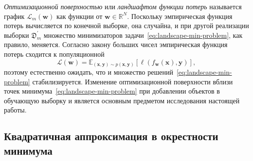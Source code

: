 \emph{Оптимизационной поверхностью} или \emph{ландшафтом функции потерь} называется график $\mathcal{L}_{m}(\mathbf{w})$ как функции от $\mathbf{w} \in \mathbb{R}^N$. Поскольку эмпирическая функция потерь вычисляется по конечной выборке, она случайна, и при другой реализации выборки $\mathfrak{D}_{m}^{\prime}$ множество минимизаторов задачи~\eqref{eq:landscape-min-problem}, как правило, меняется. Согласно закону больших чисел эмпирическая функция потерь сходится к популяционной
\begin{equation}
    \label{eq:landscape-theoretical-loss}
    \mathcal{L}(\mathbf{w}) = \mathbb{E}_{(\mathbf{x},\mathbf{y}) \sim p(\mathbf{x},\mathbf{y})}[\ell(f_{\mathbf{w}}(\mathbf{x}), \mathbf{y})],
\end{equation}
поэтому естественно ожидать, что и множество решений~\eqref{eq:landscape-min-problem} стабилизируется. Изменение оптимизационной поверхности вблизи точек минимума~\eqref{eq:landscape-min-problem} при добавлении объектов в обучающую выборку и является основным предметом исследования настоящей работы.

\subsection{Квадратичная аппроксимация в окрестности минимума}\label{subsec:quadratic-approx}

